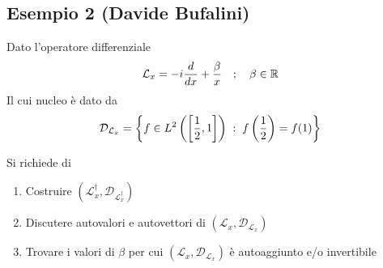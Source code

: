 \newpage

\subsection{Esempio 2 (Davide Bufalini)}

Dato l'operatore differenziale
\begin{align}
	\mathcal{L}_x = -i \frac{d}{dx} + \frac{\beta}{x} \quad ; \quad \beta \in \mathbb{R}
\end{align}
Il cui nucleo è dato da
\begin{align}
	\mathcal{D}_{\mathcal{L}_x} = \left\{ f \in L^2 \left( \left[\frac{1}{2},1\right] \right) \; : \; f\left(\frac{1}{2}\right) = f(1) \right\}
\end{align}

Si richiede di
\begin{enumerate}
	\item Costruire $(\mathcal{L}_x^\dagger, \mathcal{D}_{\mathcal{L}_x^\dagger})$
	\item Discutere autovalori e autovettori di $(\mathcal{L}_x, \mathcal{D}_{\mathcal{L}_x})$
	\item Trovare i valori di $\beta$ per cui $(\mathcal{L}_x, \mathcal{D}_{\mathcal{L}_x})$ è autoaggiunto e/o invertibile
\end{enumerate}

